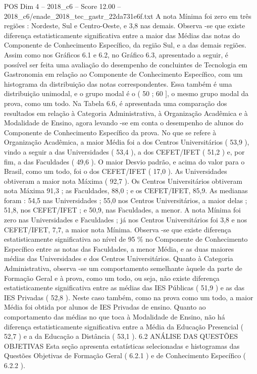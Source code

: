 \begin{textsample}{POS Dim 4 – 2018\_c6 – Score 12.00 – 2018\_c6/enade\_2018\_tec\_gastr\_22da731e6f.txt}
A nota Mínima foi zero em três regiões : Nordeste, Sul e Centro-Oeste, e 3,8 nas demais.
Observa -se que existe diferença estatisticamente significativa entre a maior das Médias das notas do Componente de Conhecimento Específico, da região Sul, e a das demais regiões.
Assim como nos Gráficos 6.1 e 6.2, no Gráfico 6.3, apresentado a seguir, é possível ser feita uma avaliação do desempenho de concluintes de Tecnologia em Gastronomia em relação ao Componente de Conhecimento Específico, com um histograma da distribuição das notas correspondentes.
Essa também é uma distribuição unimodal, e o grupo modal é o ( 50 ; 60 ], o mesmo grupo modal da prova, como um todo.
Na Tabela 6.6, é apresentada uma comparação dos resultados em relação à Categoria Administrativa, à Organização Acadêmica e à Modalidade de Ensino, agora levando -se em conta o desempenho de alunos do Componente de Conhecimento Específico da prova.
No que se refere à Organização Acadêmica, a maior Média foi a dos Centros Universitários ( 53,9 ), vindo a seguir a das Universidades ( 53,4 ), a dos CEFET/IFET ( 51,2 ) e, por fim, a das Faculdades ( 49,6 ).
O maior Desvio padrão, e acima do valor para o Brasil, como um todo, foi o dos CEFET/IFET ( 17,0 ).
As Universidades obtiveram a maior nota Máxima ( 92,7 ).
Os Centros Universitários obtiveram nota Máxima 91,3 ; as Faculdades, 88,0 ; e os CEFET/IFET, 85,9.
As medianas foram : 54,5 nas Universidades ; 55,0 nos Centros Universitários, a maior delas ; 51,8, nos CEFET/IFET ; e 50,9, nas Faculdades, a menor.
A nota Mínima foi zero nas Universidades e Faculdades ; já nos Centros Universitários foi 3,8 e nos CEFET/IFET, 7,7, a maior nota Mínima.
Observa -se que existe diferença estatisticamente significativa ao nível de 95 \% no Componente de Conhecimento Específico entre as notas das Faculdades, a menor Média, e as duas maiores médias das Universidades e dos Centros Universitários.
Quanto à Categoria Administrativa, observa -se um comportamento semelhante àquele da parte de Formação Geral e à prova, como um todo, ou seja, não existe diferença estatisticamente significativa entre as médias das IES Públicas ( 51,9 ) e as das IES Privadas ( 52,8 ).
Neste caso também, como na prova como um todo, a maior Média foi obtida por alunos de IES Privadas de ensino.
Quanto ao comportamento das médias no que toca à Modalidade de Ensino, não há diferença estatisticamente significativa entre a Média da Educação Presencial ( 52,7 ) e a da Educação a Distância ( 53,1 ). 6.2 ANÁLISE DAS QUESTÕES OBJETIVAS Esta seção apresenta estatísticas selecionadas e histogramas das Questões Objetivas de Formação Geral ( 6.2.1 ) e de Conhecimento Específico ( 6.2.2 ).

\end{textsample}
